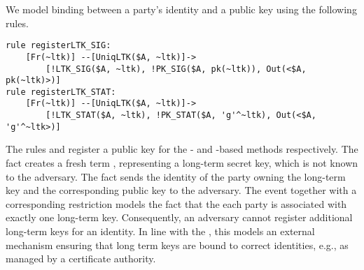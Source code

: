 We model binding between a party's identity and a public key using the
following rules.
%
\begin{lstlisting}
rule registerLTK_SIG:
    [Fr(~ltk)] --[UniqLTK($A, ~ltk)]->
        [!LTK_SIG($A, ~ltk), !PK_SIG($A, pk(~ltk)), Out(<$A, pk(~ltk)>)]
rule registerLTK_STAT:
    [Fr(~ltk)] --[UniqLTK($A, ~ltk)]->
        [!LTK_STAT($A, ~ltk), !PK_STAT($A, 'g'^~ltk), Out(<$A, 'g'^~ltk>)]
\end{lstlisting}
%
The rules  and  register a public key
for the \mSig{}- and \mStat{}-based methods respectively.
%
The fact  creates a fresh term \mbox{,} representing a long-term
secret key, which is not known to the adversary.
%
The fact \mbox{} sends the identity of the party
owning the long-term key and the corresponding public key to the adversary.
%
The event  together with a corresponding restriction models the fact
that the each party is associated with exactly one long-term key.
%
Consequently, an adversary cannot register additional long-term keys for an
identity.
%
In line with the \mEdhoc{} \mSpec{}, this models an external mechanism
ensuring that long term keys are bound to correct identities, e.g., as
managed by a certificate authority.
%

